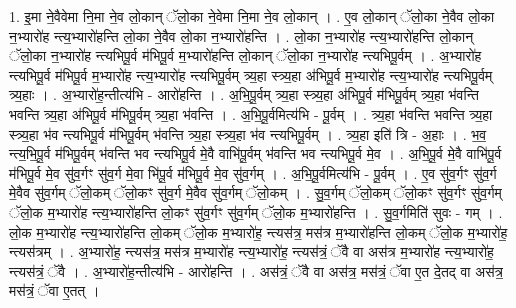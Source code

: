 \documentclass[17pt]{extarticle}
\begin{document}
1. इ॒मा ने॒वैवेमा नि॒मा ने॒व लो॒कान् ॅलो॒का ने॒वेमा नि॒मा ने॒व लो॒कान् । . ए॒व लो॒कान् ॅलो॒का ने॒वैव लो॒का न॒भ्यारो॑ह न्त्य॒भ्यारो॑हन्ति लो॒का ने॒वैव लो॒का न॒भ्यारो॑हन्ति । . लो॒का न॒भ्यारो॑ह न्त्य॒भ्यारो॑हन्ति लो॒कान् ॅलो॒का न॒भ्यारो॑ह न्त्यभिपू॒र्व म॑भिपू॒र्व म॒भ्यारो॑हन्ति लो॒कान् ॅलो॒का न॒भ्यारो॑ह न्त्यभिपू॒र्वम् । . अ॒भ्यारो॑ह न्त्यभिपू॒र्व म॑भिपू॒र्व म॒भ्यारो॑ह न्त्य॒भ्यारो॑ह न्त्यभिपू॒र्वम् त्र्य॒हा स्त्र्य॒हा अ॑भिपू॒र्व म॒भ्यारो॑ह न्त्य॒भ्यारो॑ह न्त्यभिपू॒र्वम् त्र्य॒हाः । . अ॒भ्यारो॑ह॒न्तीत्य॑भि - आरो॑हन्ति । . अ॒भि॒पू॒र्वम् त्र्य॒हा स्त्र्य॒हा अ॑भिपू॒र्व म॑भिपू॒र्वम् त्र्य॒हा भ॑वन्ति भवन्ति त्र्य॒हा अ॑भिपू॒र्व म॑भिपू॒र्वम् त्र्य॒हा भ॑वन्ति । . अ॒भि॒पू॒र्वमित्य॑भि - पू॒र्वम् । . त्र्य॒हा भ॑वन्ति भवन्ति त्र्य॒हा स्त्र्य॒हा भ॑व न्त्यभिपू॒र्व म॑भिपू॒र्वम् भ॑वन्ति त्र्य॒हा स्त्र्य॒हा भ॑व
न्त्यभिपू॒र्वम् । . त्र्य॒हा इति॑ त्रि - अ॒हाः । . भ॒व॒ न्त्य॒भि॒पू॒र्व म॑भिपू॒र्वम् भ॑वन्ति भव न्त्यभिपू॒र्व मे॒वै वाभि॑पू॒र्वम् भ॑वन्ति भव न्त्यभिपू॒र्व मे॒व । . अ॒भि॒पू॒र्व मे॒वै वाभि॑पू॒र्व म॑भिपू॒र्व मे॒व सु॑व॒र्गꣳ सु॑व॒र्ग मे॒वा भि॑पू॒र्व म॑भिपू॒र्व मे॒व सु॑व॒र्गम् । . अ॒भि॒पू॒र्वमित्य॑भि - पू॒र्वम् । . ए॒व सु॑व॒र्गꣳ सु॑व॒र्ग मे॒वैव सु॑व॒र्गम् ॅलो॒कम् ॅलो॒कꣳ सु॑व॒र्ग मे॒वैव सु॑व॒र्गम् ॅलो॒कम् । . सु॒व॒र्गम् ॅलो॒कम् ॅलो॒कꣳ सु॑व॒र्गꣳ सु॑व॒र्गम् ॅलो॒क म॒भ्यारो॑ह न्त्य॒भ्यारो॑हन्ति लो॒कꣳ सु॑व॒र्गꣳ सु॑व॒र्गम् ॅलो॒क म॒भ्यारो॑हन्ति । . सु॒व॒र्गमिति॑ सुवः - गम् । . लो॒क म॒भ्यारो॑ह न्त्य॒भ्यारो॑हन्ति लो॒कम् ॅलो॒क म॒भ्यारो॑ह॒ न्त्यस॑त्र॒ मस॑त्र म॒भ्यारो॑हन्ति लो॒कम् ॅलो॒क म॒भ्यारो॑ह॒ न्त्यस॑त्रम् । . अ॒भ्यारो॑ह॒ न्त्यस॑त्र॒ मस॑त्र म॒भ्यारो॑ह न्त्य॒भ्यारो॑ह॒ न्त्यस॑त्रं॒ ॅवै वा अस॑त्र म॒भ्यारो॑ह न्त्य॒भ्यारो॑ह॒ न्त्यस॑त्रं॒ ॅवै । . अ॒भ्यारो॑ह॒न्तीत्य॑भि - आरो॑हन्ति । . अस॑त्रं॒ ॅवै वा अस॑त्र॒ मस॑त्रं॒ ॅवा ए॒त दे॒तद् वा अस॑त्र॒ मस॑त्रं॒ ॅवा ए॒तत् । \newline
\end{document}
